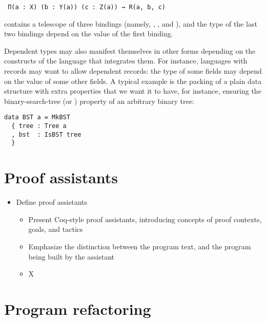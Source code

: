 \texttt{
Π(a : X) (b : Y(a)) (c : Z(a)) → R(a, b, c)
}

contains a telescope of three bindings (namely, , ,
and ), and the type of the last two bindings depend on the value of
the first binding.

Dependent types may also manifest themselves in other forms depending on the
constructs of the language that integrates them.  For instance, languages with
records may want to allow dependent records: the type of some fields may depend
on the value of some other fields.  A typical example is the packing of a plain
data structure with extra properties that we want it to have, for instance,
ensuring the binary-search-tree (or ) property of an arbitrary
binary tree:

\begin{verbatim}
data BST a = MkBST
  { tree : Tree a
  , bst  : IsBST tree
  }
\end{verbatim}

\section{Proof assistants}

\begin{itemize}

  \item Define proof assistants

        \begin{itemize}

          \item Present Coq-style proof assistants, introducing concepts of
proof contexts, goals, and tactics

          \item Emphasize the distinction between the program text, and the
program being built by the assistant

          \item X

        \end{itemize}

\end{itemize}

\section{Program refactoring}

